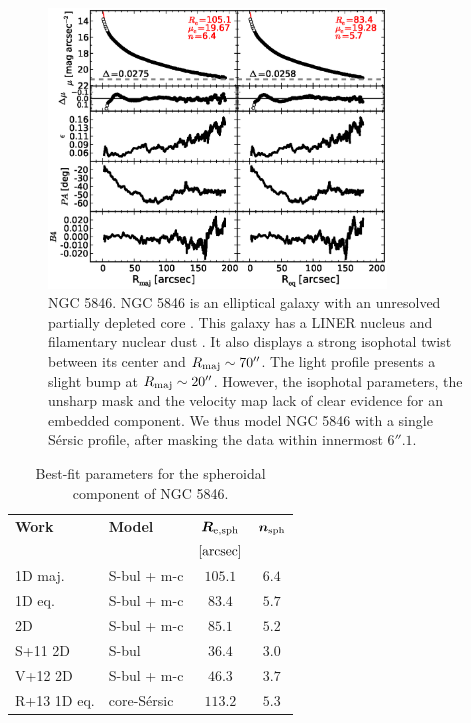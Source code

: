 \documentclass[preprint2]{emulateapj}
\newcommand{\fitfigurewidth}{0.8\textwidth}
\begin{document}
  \begin{figure}[h]
  \begin{center}
  \includegraphics[width=\fitfigurewidth]{images/n5846_1Dfit.eps}
  \caption{NGC 5846.
  NGC 5846 is an elliptical galaxy with an unresolved partially depleted core \citep{rusli2013}. %
  This galaxy has a LINER nucleus \citep{carrillo1999} and filamentary nuclear dust \citep{tran2001}.
  It also displays a strong isophotal twist between its center and $R_{\rm maj} \sim 70''$.
  The light profile presents a slight bump at $R_{\rm maj} \sim 20''$.
  However, the isophotal parameters, the unsharp mask and the velocity map lack of clear evidence for an embedded component.
  We thus model NGC 5846 with a single S\'ersic profile, after masking the data within innermost $6''.1$.
  }
  \end{center}
  \end{figure}

  \begin{table}[h]
  \small
  \caption{Best-fit parameters for the spheroidal component of NGC 5846.}
  \begin{center}
  \begin{tabular}{llcc}
  \hline
  {\bf Work} & {\bf Model}   & $\bm R_{\rm e,sph}$    & $\bm n_{\rm sph}$ \\
    &  &  $[\rm arcsec]$ & \\
  \hline
  1D maj. & S-bul + m-c & $105.1$  &  $6.4$ \\
  1D eq.  & S-bul + m-c & $83.4$	&  $5.7$ \\
  2D      & S-bul + m-c & $85.1$	&  $5.2$ \\
  \hline
  S+11 2D      & S-bul	    & $36.4$   &  $3.0$ \\
  V+12 2D      & S-bul + m-c   & $46.3$   &  $3.7$ \\
  R+13 1D eq.      & core-S\'ersic & $113.2$  &  $5.3$ \\
  \hline
  \end{tabular}
  \end{center}
  \label{tab:n5846}
  \end{table}
\end{document}
